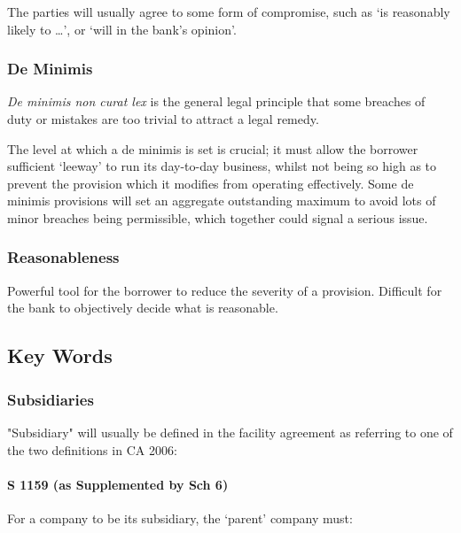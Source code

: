 \documentclass[
]{article}
\begin{document}
The parties will usually agree to some form of compromise, such as `is
reasonably likely to \ldots', or `will in the bank's opinion'.

\hypertarget{de-minimis}{%
\subsubsection{De Minimis}\label{de-minimis}}

\emph{De minimis non curat lex} is the general legal principle that some
breaches of duty or mistakes are too trivial to attract a legal remedy.

The level at which a de minimis is set is crucial; it must allow the
borrower sufficient `leeway' to run its day-to-day business, whilst not
being so high as to prevent the provision which it modifies from
operating effectively. Some de minimis provisions will set an aggregate
outstanding maximum to avoid lots of minor breaches being permissible,
which together could signal a serious issue.

\hypertarget{reasonableness}{%
\subsubsection{Reasonableness}\label{reasonableness}}

Powerful tool for the borrower to reduce the severity of a provision.
Difficult for the bank to objectively decide what is reasonable.

\hypertarget{key-words}{%
\subsection{Key Words}\label{key-words}}

\hypertarget{subsidiaries}{%
\subsubsection{Subsidiaries}\label{subsidiaries}}

"Subsidiary" will usually be defined in the facility agreement as
referring to one of the two definitions in CA 2006:

\hypertarget{s-1159-as-supplemented-by-sch-6}{%
\paragraph{S 1159 (as Supplemented by Sch
6)}\label{s-1159-as-supplemented-by-sch-6}}

For a company to be its subsidiary, the `parent' company must:
\end{document}
